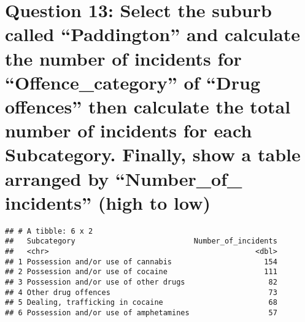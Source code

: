\documentclass[
]{article}
\newenvironment{Shaded}{\begin{snugshade}}{\end{snugshade}}
\newcommand{\CommentTok}[1]{\textcolor[rgb]{0.56,0.35,0.01}{\textit{#1}}}
\newcommand{\DataTypeTok}[1]{\textcolor[rgb]{0.13,0.29,0.53}{#1}}
\newcommand{\KeywordTok}[1]{\textcolor[rgb]{0.13,0.29,0.53}{\textbf{#1}}}
\newcommand{\NormalTok}[1]{#1}
\newcommand{\OperatorTok}[1]{\textcolor[rgb]{0.81,0.36,0.00}{\textbf{#1}}}
\newcommand{\StringTok}[1]{\textcolor[rgb]{0.31,0.60,0.02}{#1}}
\begin{document}
\hypertarget{question-13-select-the-suburb-called-paddington-and-calculate-the-number-of-incidents-for-offence_category-of-drug-offences-then-calculate-the-total-number-of-incidents-for-each-subcategory.-finally-show-a-table-arranged-by-number_of_-incidents-high-to-low}{%
\section{Question 13: Select the suburb called ``Paddington'' and
calculate the number of incidents for ``Offence\_category'' of ``Drug
offences'' then calculate the total number of incidents for each
Subcategory. Finally, show a table arranged by ``Number\_of\_
incidents'' (high to
low)}\label{question-13-select-the-suburb-called-paddington-and-calculate-the-number-of-incidents-for-offence_category-of-drug-offences-then-calculate-the-total-number-of-incidents-for-each-subcategory.-finally-show-a-table-arranged-by-number_of_-incidents-high-to-low}}

\begin{Shaded}
\end{Shaded}

\begin{verbatim}
## # A tibble: 6 x 2
##   Subcategory                           Number_of_incidents
##   <chr>                                               <dbl>
## 1 Possession and/or use of cannabis                     154
## 2 Possession and/or use of cocaine                      111
## 3 Possession and/or use of other drugs                   82
## 4 Other drug offences                                    73
## 5 Dealing, trafficking in cocaine                        68
## 6 Possession and/or use of amphetamines                  57
\end{verbatim}
\end{document}
